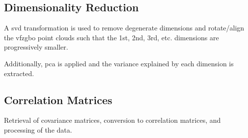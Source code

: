 \documentclass[final,twocolumn,12pt]{elsarticle}
\begin{document}
%	
%	
%	
%	
%	

    \subsection{Dimensionality Reduction}
    A \gls{svd} transformation is used to remove degenerate dimensions and rotate/align the \gls{vfzgbo} point clouds such that the 1st, 2nd, 3rd, etc. dimensions are progressively smaller.
    
    Additionally, \gls{pca} is applied and the variance explained by each dimension is extracted.

    \subsection{Correlation Matrices} \label{sec:methods:correlation}
    Retrieval of covariance matrices, conversion to correlation matrices, and processing of the data. %
    
\end{document}
